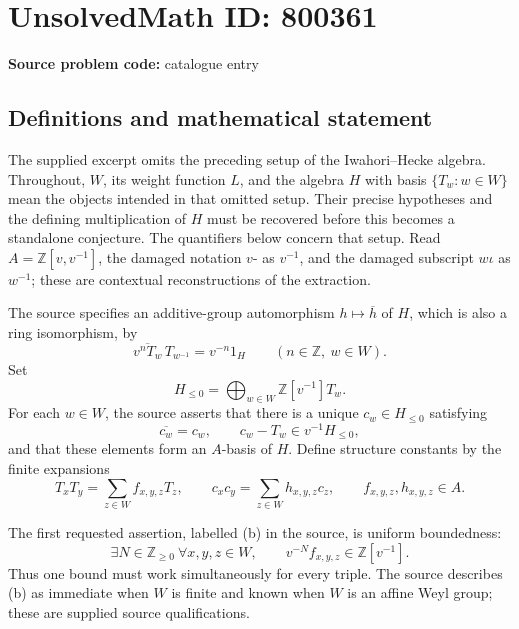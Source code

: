 \documentclass[11pt]{article}
\begin{document}
\section*{UnsolvedMath ID: 800361}
\textbf{Source problem code:} catalogue entry
\subsection{Definitions and mathematical statement}
The supplied excerpt omits the preceding setup of the Iwahori--Hecke algebra. Throughout, \(W\), its weight function \(L\), and the algebra \(H\) with basis \(\{T_w:w\in W\}\) mean the objects intended in that omitted setup. Their precise hypotheses and the defining multiplication of \(H\) must be recovered before this becomes a standalone conjecture. The quantifiers below concern that setup. Read \(A=\mathbb Z[v,v^{-1}]\), the damaged notation \(v\text{-}\) as \(v^{-1}\), and the damaged subscript \(w\iota\) as \(w^{-1}\); these are contextual reconstructions of the extraction.

The source specifies an additive-group automorphism \(h\mapsto\overline h\) of \(H\), which is also a ring isomorphism, by
\[
\overline{v^nT_w}\,T_{w^{-1}}=v^{-n}1_H
\qquad(n\in\mathbb Z,\ w\in W).
\]
Set
\[
H_{\leq0}=\bigoplus_{w\in W}\mathbb Z[v^{-1}]T_w.
\]
For each \(w\in W\), the source asserts that there is a unique \(c_w\in H_{\leq0}\) satisfying
\[
\overline{c_w}=c_w,\qquad c_w-T_w\in v^{-1}H_{\leq0},
\]
and that these elements form an \(A\)-basis of \(H\). Define structure constants by the finite expansions
\[
T_xT_y=\sum_{z\in W}f_{x,y,z}T_z,
\qquad
c_xc_y=\sum_{z\in W}h_{x,y,z}c_z,
\qquad f_{x,y,z},h_{x,y,z}\in A.
\]

The first requested assertion, labelled (b) in the source, is uniform boundedness:
\[
\exists N\in\mathbb Z_{\geq0}\ \forall x,y,z\in W,
\qquad v^{-N}f_{x,y,z}\in\mathbb Z[v^{-1}].
\tag{b}
\]
Thus one bound must work simultaneously for every triple. The source describes (b) as immediate when \(W\) is finite and known when \(W\) is an affine Weyl group; these are supplied source qualifications.
\end{document}
